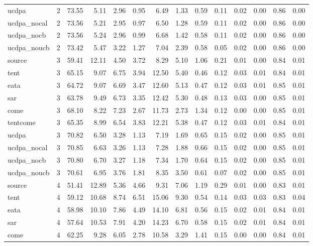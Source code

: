 \begin{tabular}{lrrrrrrrrrrrrr}
ucdpa & 2 & 73.55 & 5.11 & 2.96 & 0.95 & 6.49 & 1.33 & 0.59 & 0.11 & 0.02 & 0.00 & 0.86 & 0.00 \\
ucdpa_nocal & 2 & 73.56 & 5.21 & 2.95 & 0.97 & 6.50 & 1.28 & 0.59 & 0.11 & 0.02 & 0.00 & 0.86 & 0.00 \\
ucdpa_nocb & 2 & 73.56 & 5.24 & 2.96 & 0.99 & 6.68 & 1.42 & 0.58 & 0.11 & 0.02 & 0.00 & 0.86 & 0.00 \\
ucdpa_noucb & 2 & 73.42 & 5.47 & 3.22 & 1.27 & 7.04 & 2.39 & 0.58 & 0.05 & 0.02 & 0.00 & 0.86 & 0.00 \\
source & 3 & 59.41 & 12.11 & 4.50 & 3.72 & 8.29 & 5.10 & 1.06 & 0.21 & 0.01 & 0.00 & 0.84 & 0.01 \\
tent & 3 & 65.15 & 9.07 & 6.75 & 3.94 & 12.50 & 5.40 & 0.46 & 0.12 & 0.03 & 0.01 & 0.84 & 0.01 \\
eata & 3 & 64.72 & 9.07 & 6.69 & 3.47 & 12.60 & 5.13 & 0.47 & 0.12 & 0.03 & 0.01 & 0.85 & 0.01 \\
sar & 3 & 63.78 & 9.49 & 6.73 & 3.35 & 12.42 & 5.30 & 0.48 & 0.13 & 0.03 & 0.00 & 0.85 & 0.01 \\
come & 3 & 68.10 & 8.22 & 7.23 & 2.67 & 11.73 & 2.73 & 1.34 & 0.12 & 0.00 & 0.00 & 0.85 & 0.01 \\
tentcome & 3 & 65.35 & 8.99 & 6.54 & 3.83 & 12.21 & 5.38 & 0.47 & 0.12 & 0.03 & 0.01 & 0.84 & 0.01 \\
ucdpa & 3 & 70.82 & 6.50 & 3.28 & 1.13 & 7.19 & 1.69 & 0.65 & 0.15 & 0.02 & 0.00 & 0.85 & 0.01 \\
ucdpa_nocal & 3 & 70.85 & 6.63 & 3.26 & 1.13 & 7.28 & 1.88 & 0.66 & 0.15 & 0.02 & 0.00 & 0.85 & 0.01 \\
ucdpa_nocb & 3 & 70.80 & 6.70 & 3.27 & 1.18 & 7.34 & 1.70 & 0.64 & 0.15 & 0.02 & 0.00 & 0.85 & 0.01 \\
ucdpa_noucb & 3 & 70.61 & 6.95 & 3.76 & 1.81 & 8.35 & 3.50 & 0.61 & 0.07 & 0.02 & 0.00 & 0.85 & 0.01 \\
source & 4 & 51.41 & 12.89 & 5.36 & 4.66 & 9.31 & 7.06 & 1.19 & 0.29 & 0.01 & 0.00 & 0.83 & 0.01 \\
tent & 4 & 59.12 & 10.68 & 8.74 & 6.51 & 15.06 & 9.30 & 0.54 & 0.14 & 0.03 & 0.03 & 0.83 & 0.04 \\
eata & 4 & 58.98 & 10.10 & 7.86 & 4.49 & 14.10 & 6.81 & 0.56 & 0.15 & 0.02 & 0.01 & 0.84 & 0.01 \\
sar & 4 & 57.64 & 10.53 & 7.91 & 4.20 & 14.23 & 6.70 & 0.58 & 0.15 & 0.02 & 0.01 & 0.84 & 0.01 \\
come & 4 & 62.25 & 9.28 & 6.05 & 2.78 & 10.58 & 3.29 & 1.41 & 0.15 & 0.00 & 0.00 & 0.84 & 0.01 \\

\end{tabular}
